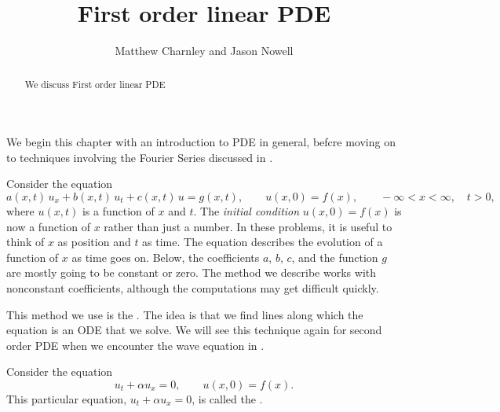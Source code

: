 \documentclass{ximera}
\title{First order linear PDE}
\author{Matthew Charnley and Jason Nowell}
\begin{document}
\begin{abstract}
    We discuss First order linear PDE
\end{abstract}
\maketitle

\label{fopde:section}




We begin this chapter with an introduction to PDE in general, befcre moving on to techniques involving the Fourier Series discussed in .

Consider the equation
\begin{equation*}
    a(x,t) \, u_x + b(x,t) \, u_t + c(x,t) \, u = g(x,t), \qquad u(x,0) = f(x) , \qquad -\infty < x < \infty, \quad t > 0 ,
\end{equation*}
where $u(x,t)$ is a function of $x$ and $t$. The \emph{initial condition} $u(x,0) = f(x)$ is now a function of $x$ rather than just a number. In these problems, it is useful to think of $x$ as position and $t$ as time. The equation describes the evolution of a function of $x$ as time goes on. Below, the coefficients $a$, $b$, $c$, and the function $g$ are mostly going to be constant or zero. The method we describe works with nonconstant coefficients, although the computations may get difficult quickly.

This method we use is the \emph{}. The idea is that we find lines along which the equation is an ODE that we solve. We will see this technique again for second order PDE when we encounter the wave equation in .

\begin{example}
    Consider the equation
    \begin{equation*}
        u_t + \alpha u_x = 0, \qquad u(x,0) = f(x) .
    \end{equation*}
    This particular equation, $u_t + \alpha u_x = 0$, is called the \emph{}.
\end{example}
\end{document}
